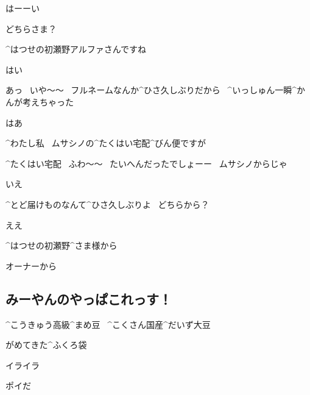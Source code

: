 \Alpha はーーい

\Alpha どちらさま？

\page[145]
\Kokone ^{はつせの}{初瀬野}アルファさんですね

\Alpha はい

\Alpha あっ
\ いや〜〜
\ フルネームなんか^{ひさ}{久}しぶりだから
\ ^{いっしゅん}{一瞬}^{かんが}{考}えちゃった

\Kokone はあ

\Kokone ^{わたし}{私}
\ ムサシノの^{たくはい}{宅配}^{びん}{便}ですが

\Alpha ^{たくはい}{宅配}
\ ふわ〜〜
\ たいへんだったでしょーー
\ ムサシノからじゃ

\Kokone いえ

\page[146]
\Alpha ^{とど}{届}けものなんて^{ひさ}{久}しぶりよ
\ どちらから？

\Kokone ええ

\Kokone ^{はつせの}{初瀬野}^{さま}{様}から

\Alpha オーナーから


\subsection{みーやんのやっぱこれっす！}

\Sign ^{こうきゅう}{高級}^{まめ}{豆}
\ ^{こくさん}{国産}^{だいず}{大豆}

\Sign がめてきた^{ふくろ}{袋}

\Sign イライラ

\Sign ポイだ
